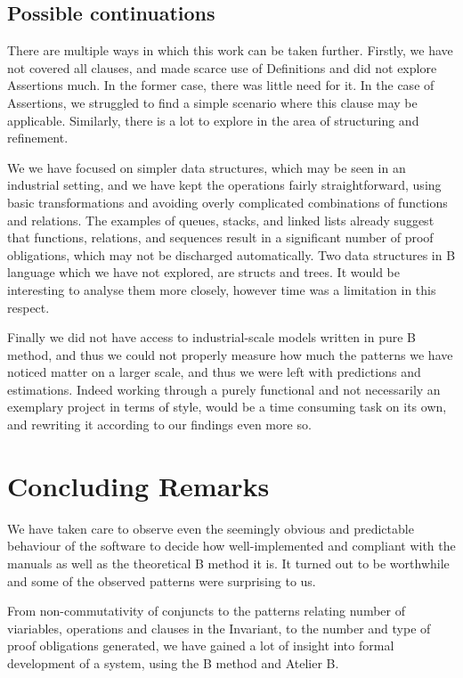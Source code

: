 \documentclass[12pt,journal,duplex]{IEEEtran}
\begin{document}
	\subsection{Possible continuations}
	There are multiple ways in which this work can be taken further. Firstly, we have not covered all clauses, and made scarce use of Definitions and did not explore Assertions much. In the former case, there was little need for it. In the case of Assertions, we struggled to find a simple scenario where this clause may be applicable. Similarly, there is a lot to explore in the area of structuring and refinement.

	We we have focused on simpler data structures, which may be seen in an industrial setting, and we have kept the operations fairly straightforward, using basic transformations and avoiding overly complicated combinations of functions and relations. The examples of queues, stacks, and linked lists already suggest that functions, relations, and sequences result in a significant number of proof obligations, which may not be discharged automatically. Two data structures in B language which we have not explored, are structs and trees. It would be interesting to analyse them more closely, however time was a limitation in this respect.

	Finally we did not have access to industrial-scale models written in pure B method, and thus we could not properly measure how much the patterns we have noticed matter on a larger scale, and thus we were left with predictions and estimations. Indeed working through a purely functional and not necessarily an exemplary project in terms of style, would be a time consuming task on its own, and rewriting it according to our findings even more so.

	\section{Concluding Remarks}

	We have taken care to observe even the seemingly obvious and predictable behaviour of the software to decide how well-implemented and compliant with the manuals as well as the theoretical B method it is. It turned out to be worthwhile and some of the observed patterns were surprising to us.

	From non-commutativity of conjuncts to the patterns relating number of viariables, operations and clauses in the Invariant, to the number and type of proof obligations generated, we have gained a lot of insight into formal development of a system, using the B method and Atelier B.
\end{document}
